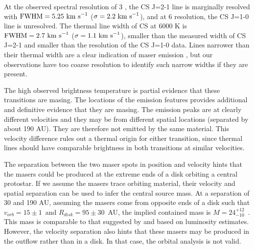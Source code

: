 \documentclass[twocolumn]{aastex62}
\begin{document}
At the observed spectral resolution of 3 \kms, the CS J=2-1 line is marginally
resolved with ${\mathrm{FWHM} = 5.25~\textrm{km~s}^{-1}}$ (${\sigma=2.2~\textrm{km~s}^{-1}}$), and at 6
\kms resolution, the CS J=1-0 line is unresolved.  The thermal line width of CS
at 6000 K is ${\mathrm{FWHM} = 2.7~\textrm{km~s}^{-1}}$ (${\sigma=1.1~\textrm{km~s}^{-1}}$),
smaller than the measured width of CS J=2-1 and smaller than the resolution
of the CS J=1-0 data. 
Lines narrower than their thermal width are a clear indication of maser
emission \citep{Elitzur1982a}, but our observations have too coarse resolution
to identify such narrow widths if they are present.


The high observed brightness temperature is partial evidence that these
transitions are masing.  The locations of the emission features provides
additional and definitive evidence that they are masing.  The emission peaks
are at clearly different velocities and they may be from different spatial
locations (separated by about 190 AU).  They are therefore not emitted by the
same material.  This velocity difference rules out a thermal origin for either
transition, since thermal lines should have comparable brightness in both
transitions at similar velocities.

The separation between the two maser spots in position and velocity hints
that the masers could be produced at the extreme ends of a disk orbiting
a central protostar.  
If we assume the masers trace orbiting material, their velocity and spatial
separation can be used to infer the central source mass.  At a separation of 30
\kms and 190 AU, assuming the masers come from opposite ends of a disk such
that $v_{orb}=15\pm1$~\kms and $R_{disk}=95\pm30$~AU, the implied contained mass is
$M=24_{-10}^{+12}$~\msun.  This mass is comparable to that suggested by
\citet{Ginsburg2017a} and \citet{Goddi2018a} based on luminosity estimates.
However, the velocity separation also hints that these masers may be produced
in the outflow rather than in a disk.  In that case, the orbital analysis
is not valid.
\end{document}

